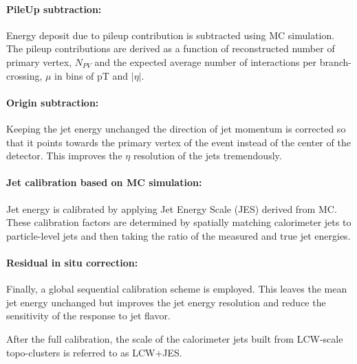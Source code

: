 
\paragraph{PileUp subtraction:}
Energy deposit due to pileup contribution is subtracted using MC simulation. The pileup contributions are derived as a function of reconstructed number of primary vertex, $N_{PV}$ and the expected average number of interactions per branch-crossing, $\mu$ in bins of pT and $|\eta|$.
\paragraph{Origin subtraction:}
Keeping the jet energy unchanged the direction of jet momentum is corrected so that it points towards the primary vertex of the event instead of the center of the detector. This improves the $\eta$ resolution of the jets tremendously. 
\paragraph{Jet calibration based on MC simulation:}
Jet energy is calibrated by applying Jet Energy Scale (JES) derived from MC. These calibration factors are determined by spatially matching calorimeter jets to particle-level jets and then taking the ratio of the measured and true jet energies. 
\paragraph{Residual in situ correction:}
Finally, a global sequential calibration scheme is employed. This leaves the mean jet energy unchanged but improves the jet energy resolution and reduce the sensitivity of the response to jet flavor. 

After the full calibration, the scale of the calorimeter jets built from LCW-scale topo-clusters is referred to as LCW+JES. 

